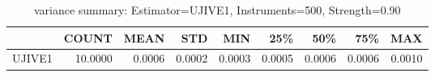 \begin{table}[ht]
\centering
\caption{variance summary: Estimator=UJIVE1, Instruments=500, Strength=0.90}
\begin{tabular}{lrrrrrrrr}
\toprule
 & COUNT & MEAN & STD & MIN & 25\% & 50\% & 75\% & MAX \\
\midrule
UJIVE1 & 10.0000 & 0.0006 & 0.0002 & 0.0003 & 0.0005 & 0.0006 & 0.0006 & 0.0010 \\
\bottomrule
\end{tabular}
\end{table}

